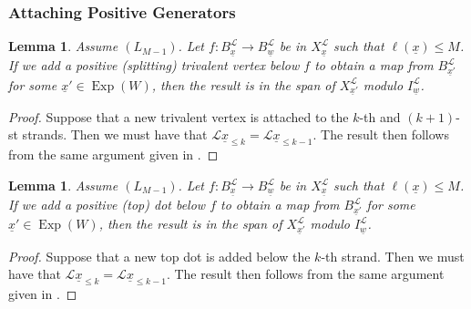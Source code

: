 \documentclass{amsart}
\newcommand{\scrL}{\mathcal{L}}
\DeclareMathOperator{\Exp}{Exp}
\newcommand{\uw}{\underline{w}}
\newcommand{\ux}{\underline{x}}
\newtheorem{lemma}[subsubsection]{Lemma}
\theoremstyle{definition}
\numberwithin{equation}{subsection}
\begin{document}
\subsubsection{Attaching Positive Generators}\label{subsec:add_pos_generators}

\begin{lemma}\label{lem:add_pos_trivalent}
    Assume $(L_{M-1})$. Let $f : B_{\ux}^{\scrL} \to B_{\uw}^{\scrL}$ be in $X_{\ux}^{\scrL}$ such that $\ell (\ux) \leq M$.
    If we add a positive (splitting) trivalent vertex below $f$ to obtain a map from $B_{\ux'}^{\scrL}$ for some $\ux' \in \Exp (W)$, then the result is in the span of $X_{\ux'}^{\scrL}$ modulo $I_{\uw}^{\scrL}$.
\end{lemma}
\begin{proof}
    Suppose that a new trivalent vertex is attached to the $k$-th and $(k+1)$-st strands. Then we must have that $\scrL \ux_{\leq k} = \scrL \ux_{\leq k-1}$.
    The result then follows from the same argument given in \cite[Claim 7.15]{EW}.   
\end{proof}

\begin{lemma}\label{lem:add_pos_dot}
    Assume $(L_{M-1})$. Let $f : B_{\ux}^{\scrL} \to B_{\uw}^{\scrL}$  be in $X_{\ux}^{\scrL}$ such that $\ell (\ux) \leq M$.
    If we add a positive (top) dot below $f$ to obtain a map from $B_{\ux'}^{\scrL}$ for some $\ux' \in \Exp (W)$, then the result is in the span of $X_{\ux'}^{\scrL}$ modulo $I_{\uw}^{\scrL}$.
\end{lemma}
\begin{proof}
    Suppose that a new top dot is added below the $k$-th strand. 
    Then we must have that $\scrL \ux_{\leq k} = \scrL \ux_{\leq k-1}$.
    The result then follows from the same argument given in \cite[Claim 7.17]{EW}.   
\end{proof}
\end{document}

